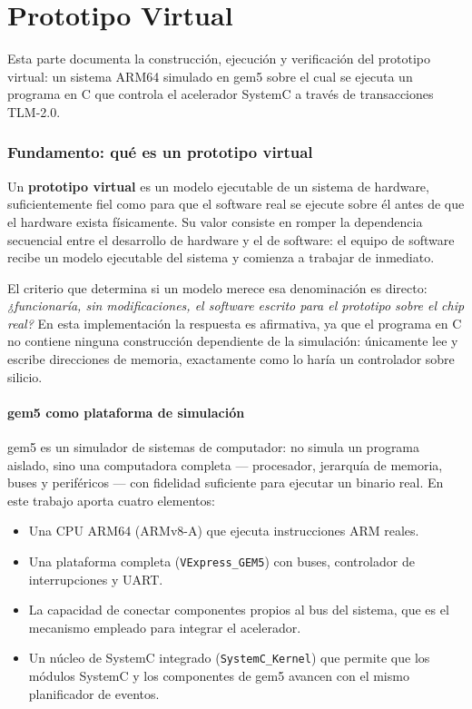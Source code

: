 \documentclass[11pt,letterpaper]{article}
\begin{document}
\part{Prototipo Virtual}
\label{part:vp}

Esta parte documenta la construcción, ejecución y verificación del prototipo
virtual: un sistema ARM64 simulado en gem5 sobre el cual se ejecuta un programa
en C que controla el acelerador SystemC a través de transacciones TLM-2.0.

\section{Fundamento: qué es un prototipo virtual}

Un \textbf{prototipo virtual} es un modelo ejecutable de un sistema de hardware,
suficientemente fiel como para que el software real se ejecute sobre él antes de
que el hardware exista físicamente. Su valor consiste en romper la dependencia
secuencial entre el desarrollo de hardware y el de software: el equipo de
software recibe un modelo ejecutable del sistema y comienza a trabajar de
inmediato.

El criterio que determina si un modelo merece esa denominación es directo:
\emph{¿funcionaría, sin modificaciones, el software escrito para el prototipo
sobre el chip real?} En esta implementación la respuesta es afirmativa, ya que
el programa en C no contiene ninguna construcción dependiente de la simulación:
únicamente lee y escribe direcciones de memoria, exactamente como lo haría un
controlador sobre silicio.

\subsection{gem5 como plataforma de simulación}

gem5 es un simulador de sistemas de computador: no simula un programa aislado,
sino una computadora completa --- procesador, jerarquía de memoria, buses y
periféricos --- con fidelidad suficiente para ejecutar un binario real. En este
trabajo aporta cuatro elementos:

\begin{itemize}[leftmargin=*,itemsep=2pt]
  \item Una CPU ARM64 (ARMv8-A) que ejecuta instrucciones ARM reales.
  \item Una plataforma completa (\texttt{VExpress\_GEM5}) con buses,
        controlador de interrupciones y UART.
  \item La capacidad de conectar componentes propios al bus del sistema, que es
        el mecanismo empleado para integrar el acelerador.
  \item Un núcleo de SystemC integrado (\texttt{SystemC\_Kernel}) que permite
        que los módulos SystemC y los componentes de gem5 avancen con el mismo
        planificador de eventos.
\end{itemize}
\end{document}
